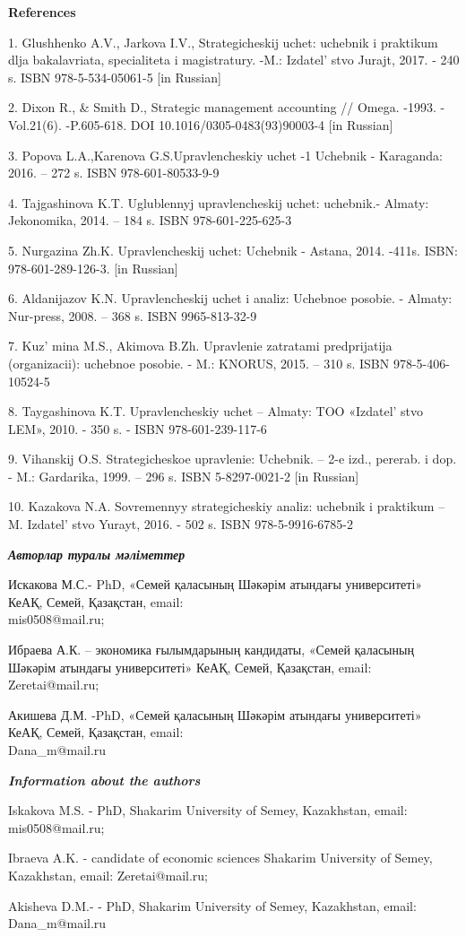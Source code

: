 \begin{center}
{\bfseries References}
\end{center}

\begin{references}
1. Glushhenko A.V., Jarkova I.V., Strategicheskij uchet: uchebnik i
praktikum dlja bakalavriata, specialit\-eta i magistratury. -M.:
Izdatel' stvo Jurajt, 2017. - 240 s. ISBN
978-5-534-05061-5 {[}in Russian{]}

2. Dixon R., \& Smith D., Strategic management accounting // Omega.
-1993. -Vol.21(6). -P.605-618. DOI 10.1016/0305-0483(93)90003-4 {[}in
Russian{]}

3. Popova L.A.,Karenova G.S.Upravlencheskiy uchet -1 Uchebnik -
Karaganda: 2016. -- 272 s. ISBN 978-601-80533-9-9

4. Tajgashinova K.T. Uglublennyj upravlencheskij uchet: uchebnik.-
Almaty: Jekonomika, 2014. -- 184 s. ISBN 978-601-225-625-3

5. Nurgazina Zh.K. Upravlencheskij uchet: Uchebnik - Astana, 2014.
-411s. ISBN: 978-601-289-126-3. {[}in Russian{]}

6. Aldanijazov K.N. Upravlencheskij uchet i analiz: Uchebnoe posobie. -
Almaty: Nur-press, 2008. -- 368 s. ISBN 9965-813-32-9

7. Kuz' mina M.S., Akimova B.Zh. Upravlenie zatratami
predprijatija (organizacii): uchebnoe posobie. - M.: KNORUS, 2015. --
310 s. ISBN 978-5-406-10524-5

8. Taygashinova K.T. Upravlencheskiy uchet -- Almaty: TOO
«Izdatel' stvo LEM», 2010. - 350 s. - ISBN
978-601-239-117-6

9. Vihanskij O.S. Strategicheskoe upravlenie: Uchebnik. -- 2-e izd.,
pererab. i dop. - M.: Gardarika, 1999. -- 296 s. ISBN 5-8297-0021-2
{[}in Russian{]}

10. Kazakova N.A. Sovremennyy strategicheskiy analiz: uchebnik i
praktikum -- M. Izdatel' stvo Yurayt, 2016. - 502 s. ISBN
978-5-9916-6785-2
\end{references}

\begin{authorinfo}
\emph{{\bfseries Авторлар туралы мәліметтер}}

Искакова М.С.- PhD, «Семей қаласының Шәкәрім атындағы университеті»
КеАҚ, Семей, Қазақстан, email: \\mis0508@mail.ru;

Ибраева А.К. -- экономика ғылымдарының кандидаты, «Семей қаласының
Шәкәрім атындағы университеті» КеАҚ, Семей, Қазақстан, email: Zeretai@mail.ru;

Акишева Д.М. -PhD, «Семей қаласының Шәкәрім атындағы университеті» КеАҚ,
Семей, Қазақстан, email: \\Dana\_m@mail.ru

\emph{{\bfseries Information about the authors}}

Iskakova M.S. - PhD, Shakarim University of Semey, Kazakhstan, email:
mis0508@mail.ru;

Ibraeva A.K. - candidate of economic sciences Shakarim University of
Semey, Kazakhstan, email: Zeretai@mail.ru;

Akisheva D.M.- - PhD, Shakarim University of Semey, Kazakhstan, email:
Dana\_m@mail.ru
\end{authorinfo}
